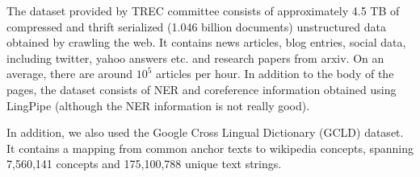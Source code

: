 The dataset provided by TREC committee consists of approximately 4.5 TB of compressed and thrift serialized (1.046 billion documents) unstructured data obtained by crawling the web. It contains news articles, blog entries, social data, including twitter, yahoo answers etc. and research papers from arxiv. On an average, there are around $10^{5}$ articles per hour. In addition to the body of the pages, the dataset consists of NER and coreference information obtained using LingPipe (although the NER information is not really good).

In addition, we also used the Google Cross Lingual Dictionary (GCLD) dataset. It contains a mapping from common anchor texts to wikipedia concepts, spanning 7,560,141 concepts and 175,100,788 unique text strings.

